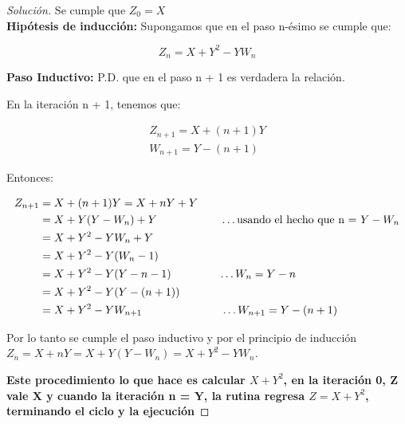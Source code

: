 \begin{proof}[Solución]
    Se cumple que $Z_0 = X$\\
    \textbf{Hipótesis de inducción:} Supongamos que en el paso n-ésimo
    se cumple que:

    \begin{equation}
      Z_n = X + Y^2-YW_n
    \end{equation}

   \textbf{Paso Inductivo:} P.D. que en el paso n + 1 es verdadera la
   relación.

   En la iteración n + 1, tenemos que:

   \begin{equation*}
     \begin{split}
       Z_{n+1} = X + (n + 1)Y\\
       W_{n+1} = Y - (n + 1)
     \end{split}
   \end{equation*}

   Entonces:

   \begin{equation*}
     \begin{split}
       Z_{n+1} & = X + (n + 1)Y = X + nY + Y \\
       & = X + Y(Y - W_n) + Y \hspace{2cm}\ldots \text{usando el hecho que n = } Y
       - W_n\\
       & = X + Y^2 - YW_n + Y\\
       & = X + Y^2 - Y(W_n - 1)\\
       & = X + Y^2 - Y(Y - n - 1) \hspace{1.5cm}\ldots W_n = Y - n\\
       & = X + Y^2 - Y(Y - (n + 1))\\
       & = X + Y^2 - YW_{n + 1} \hspace{2.5cm}\ldots W_{n+1} = Y - (n + 1)
     \end{split}
   \end{equation*}

   Por lo tanto se cumple el paso inductivo y por el principio de
   inducción $Z_n = X + nY = X + Y(Y - W_n) = X + Y^2 - YW_n$.

   \textbf{Este procedimiento lo que hace es calcular $X + Y^2$, en la
     iteración 0, Z vale X y cuando la iteración n = Y,  la rutina
     regresa $Z = X + Y^2$, terminando el ciclo y la ejecución}
  \end{proof}